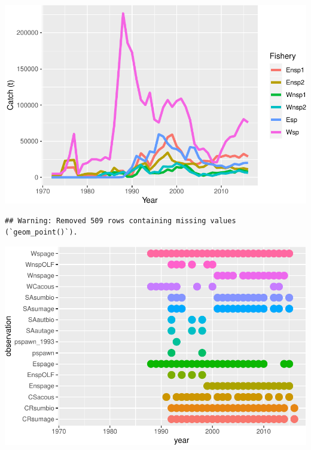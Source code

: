 \documentclass[
]{book}
\newenvironment{Shaded}{\begin{snugshade}}{\end{snugshade}}
\newcommand{\AttributeTok}[1]{\textcolor[rgb]{0.77,0.63,0.00}{#1}}
\newcommand{\FunctionTok}[1]{\textcolor[rgb]{0.00,0.00,0.00}{#1}}
\newcommand{\NormalTok}[1]{#1}
\newcommand{\SpecialCharTok}[1]{\textcolor[rgb]{0.00,0.00,0.00}{#1}}
\newcommand{\StringTok}[1]{\textcolor[rgb]{0.31,0.60,0.02}{#1}}
\begin{document}
\includegraphics{_main_files/figure-latex/input_catches-1.pdf}

\begin{Shaded}
\end{Shaded}

\begin{verbatim}
## Warning: Removed 509 rows containing missing values (`geom_point()`).
\end{verbatim}

\includegraphics{_main_files/figure-latex/input_observations-1.pdf}
\end{document}
